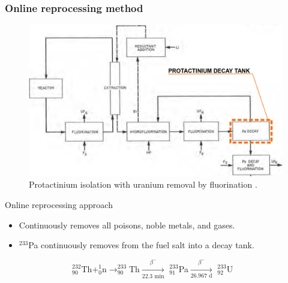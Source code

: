 \begin{frame}
  \frametitle{Online reprocessing method}
     \begin{figure}[t]
                \vspace*{-0.1in}
                \includegraphics[height=0.45\textwidth]{./images/pa_isolation.png}
                \vspace*{-0.07in}
                \caption{Protactinium isolation with uranium removal by fluorination \cite{robertson_conceptual_1971}.}
      \end{figure}
                      \vspace*{-0.17in}
             \begin{block}{Online reprocessing approach}
               \begin{itemize}             
               \item Continuously removes all poisons, noble metals, and gases.
               \item $^{233}$Pa continuously removes from the fuel salt into a decay tank.
               \end{itemize}
               \end{block}
               \vspace{-0.05in}
$\qquad\qquad\qquad\qquad^{232}_{90}$Th+$^1_0$n$\rightarrow^{233}_{90}$Th$\xrightarrow[\text{22.3 min}]{\beta^-}$ $^{233}_{91}$Pa$\xrightarrow[\text{26.967 d}]{\beta^-}$ $^{233}_{92}$U
\end{frame}




